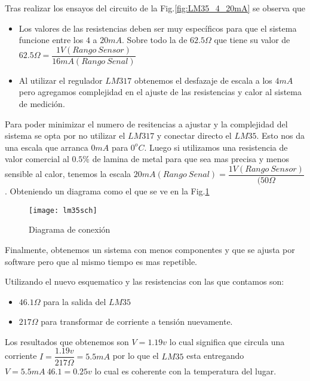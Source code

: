 
Tras realizar los ensayos del circuito de la Fig.\ref{fig:LM35_4_20mA} se observa que 
\begin{itemize}
 \item Los valores de las resistencias deben ser muy específicos para que el sistema funcione
 entre los $4$ a $20mA$. Sobre todo la de $62.5\Omega$ que tiene su valor de 
 $62.5\Omega=\dfrac{1V(Rango~Sensor)}{16mA(Rango~Senal)}$
 \item Al utilizar el regulador $LM317$ obtenemos el desfazaje de escala a los $4mA$ pero 
 agregamos complejidad en el ajuste de las resistencias y calor al sistema de medición.
\end{itemize}

Para poder minimizar el numero de resitencias a ajustar y la complejidad del sistema se 
opta por no utilizar el $LM317$ y conectar directo el $LM35$. Esto nos da una escala que 
arranca $0mA$ para $0^oC$. Luego si utilizamos una resistencia de valor comercial al $0.5\%$
de lamina de metal para que sea mas precisa y menos sensible al calor, tenemos la escala 
$20mA(Rango~Senal)=\dfrac{1V(Rango~Sensor)}{(50\Omega}$. Obteniendo un diagrama como el que
se ve en la Fig.\ref{fig:esquematico}

\begin{figure}[H] %
\begin{center}
\texttt{[image: lm35sch]}
\end{center}
\caption{Diagrama de conexión}
\label{fig:esquematico}
\end{figure}

Finalmente, obtenemos un sistema con menos componentes y que se ajusta por software pero 
que al mismo tiempo es mas repetible. 

Utilizando el nuevo esquematico y las resistencias con las que contamos son:
\begin{itemize}
 \item $46.1\Omega$ para la salida del $LM35$
 \item $217\Omega$ para transformar de corriente a tensión nuevamente.
\end{itemize}

Los resultados que obtenemos son $V=1.19v$ lo cual significa que circula una corriente
$I=\dfrac{1.19v}{217\Omega}=5.5mA$ por lo que el $LM35$ esta entregando 
$V=5.5mA~46.1=0.25v$ lo cual es coherente con la temperatura del lugar.

